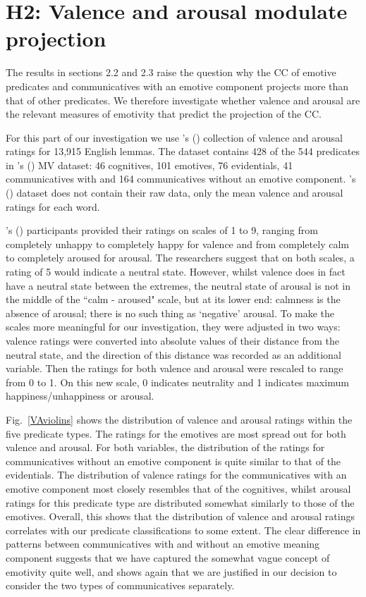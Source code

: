 \documentclass[11pt,fleqn]{article}
\newcommand{\figref}[1]{Fig.~\ref{#1}}
\newcommand{\6}{\mbox{$[\hspace*{-.6mm}[$}}
\newcommand{\9}{\mbox{$]\hspace*{-.6mm}]$}}
\newcommand{\citepos}[1]{\citeauthor{#1}'s (\citeyear{#1})}
\begin{document}
\section{H2: Valence and arousal modulate projection}

The results in sections 2.2 and 2.3 raise the question why the CC of emotive predicates and communicatives with an emotive component projects more than that of other predicates. We therefore investigate whether valence and arousal are the relevant measures of emotivity that predict the projection of the CC.

For this part of our investigation we use \citepos{warriner-etal2013} collection of valence and arousal ratings for 13,915 English lemmas. The dataset contains 428 of the 544 predicates in \citepos{white-rawlins-nels2018} MV dataset: 46 cognitives,  101 emotives, 76 evidentials, 41 communicatives with and 164 communicatives without an emotive component. \citepos{warriner-etal2013} dataset does not contain their raw data, only the mean valence and arousal ratings for each word.

\citepos{warriner-etal2013} participants provided their ratings on scales of 1 to 9, ranging from completely unhappy to completely happy for valence and from completely calm to completely aroused for arousal. The researchers suggest that on both scales, a rating of 5 would indicate a neutral state. However, whilst valence does in fact have a neutral state between the extremes, the neutral state of arousal is not in the middle of the ``calm - aroused" scale, but at its lower end: calmness is the absence of arousal; there is no such thing as `negative' arousal. To make the scales more meaningful for our investigation, they were adjusted in two ways: valence ratings were converted into absolute values of their distance from the neutral state, and the direction of this distance was recorded as an additional variable. Then the ratings for both valence and arousal were rescaled to range from 0 to 1. On this new scale, 0 indicates neutrality and 1 indicates maximum happiness/unhappiness or arousal.

\figref{VAviolins} shows the distribution of valence and arousal ratings within the five predicate types. The ratings for the emotives are most spread out for both valence and arousal. For both variables, the distribution of the ratings for communicatives without an emotive component is quite similar to that of the evidentials. The distribution of valence ratings for the communicatives with an emotive component most closely resembles that of the cognitives, whilst arousal ratings for this predicate type are distributed somewhat similarly to those of the emotives. Overall, this shows that the distribution of valence and arousal ratings correlates with our predicate classifications to some extent. The clear difference in patterns between communicatives with and without an emotive meaning component suggests that we have captured the somewhat vague concept of emotivity quite well, and shows again that we are justified in our decision to consider the two types of communicatives separately.
\end{document}

